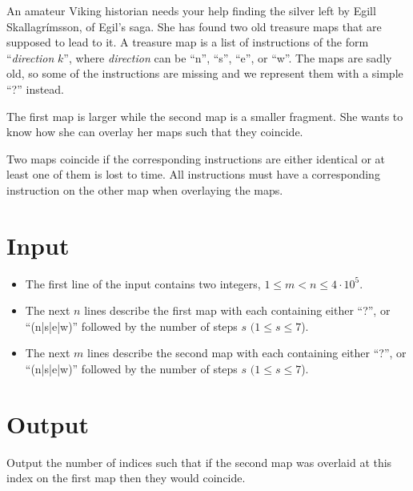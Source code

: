 
An amateur Viking historian needs your help finding the silver left by Egill Skallagrímsson, of Egil's saga.
She has found two old treasure maps that are supposed to lead to it.
A treasure map is a list of instructions of the form ``\textit{direction} $k$'',
	where \textit{direction} can be ``n'', ``s'', ``e'', or ``w''.
The maps are sadly old, so some of the instructions are missing and we represent them with a
simple ``?'' instead.

The first map is larger while the second map is a smaller fragment.
She wants to know how she can overlay her maps such that they coincide.

Two maps coincide if the corresponding instructions are either identical or at least one of them is lost to time.
All instructions must have a corresponding instruction on the other map when overlaying the maps.

\section*{Input}
\begin{itemize}
\item The first line of the input contains two integers, $1 \leq m < n \leq 4 \cdot 10^5$.
\item The next $n$ lines describe the first map with each containing either ``?'', or ``(n|s|e|w)''
      followed by the number of steps $s$ $(1 \le s \le 7$).
\item The next $m$ lines describe the second map with each containing either ``?'', or ``(n|s|e|w)''
      followed by the number of steps $s$ $(1 \le s \le 7$).
\end{itemize}

\section*{Output}
Output the number of indices such that if the second map was overlaid at this
index on the first map then they would coincide.
